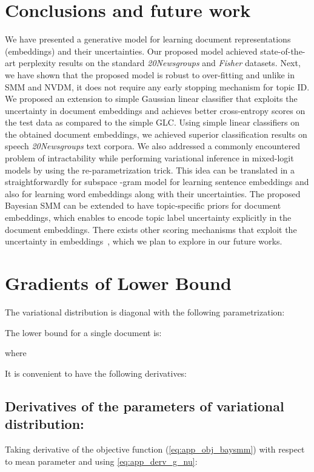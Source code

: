 \documentclass[journal]{IEEEtran}
\begin{document}
\section{Conclusions and future work}
\label{sec:concl}
We have presented a generative model for learning document representations 
(embeddings) and their uncertainties. Our proposed model achieved 
state-of-the-art perplexity results on the standard \textit{20Newsgroups} and 
\textit{Fisher} datasets. Next, we have shown that the proposed model is robust 
to over-fitting and unlike in SMM and NVDM, it does not require any early 
stopping mechanism for topic ID. We proposed an extension to simple Gaussian 
linear classifier that exploits the uncertainty in document embeddings and 
achieves better cross-entropy scores on the test data as compared to the simple 
GLC. Using simple linear classifiers on the 
obtained document embeddings, we achieved superior classification results on 
 speech \textit{20Newsgroups} text corpora. We also addressed a 
commonly encountered problem of intractability while performing variational 
inference in mixed-logit models by using the re-parametrization trick. This 
idea can be translated in a straightforwardly for subspace -gram model for 
learning sentence embeddings and also for learning word embeddings along with 
their uncertainties. The proposed Bayesian SMM can be extended to have 
topic-specific priors for document embeddings, which enables to encode topic 
label uncertainty 
explicitly in the document embeddings. There exists other scoring mechanisms 
that exploit the uncertainty in embeddings~\cite{Brummer:2018:GE}, which we 
plan to explore in our future works.






\appendices


\section{Gradients of Lower Bound}


The variational distribution is diagonal with the following parametrization:

The lower bound for a single document is:

where

It is convenient to have the following derivatives:

\subsection*{Derivatives of the parameters of variational distribution:}
Taking derivative of the objective function (\eqref{eq:app_obj_baysmm}) with 
respect to mean parameter  and using \eqref{eq:app_derv_g_nu}:
\end{document}
